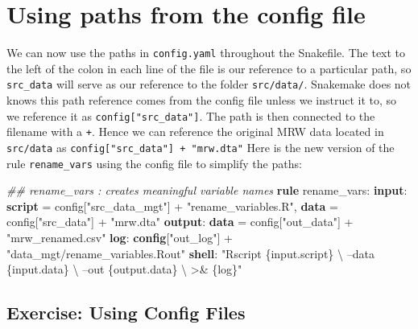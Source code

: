 \documentclass[]{book}
\newenvironment{Shaded}{\begin{snugshade}}{\end{snugshade}}
\newcommand{\KeywordTok}[1]{\textcolor[rgb]{0.13,0.29,0.53}{\textbf{{#1}}}}
\newcommand{\StringTok}[1]{\textcolor[rgb]{0.31,0.60,0.02}{{#1}}}
\newcommand{\CommentTok}[1]{\textcolor[rgb]{0.56,0.35,0.01}{\textit{{#1}}}}
\newcommand{\NormalTok}[1]{{#1}}
\theoremstyle{definition}
\theoremstyle{definition}
\theoremstyle{definition}
\theoremstyle{remark}
\begin{document}
\section{Using paths from the config
file}\label{using-paths-from-the-config-file}

We can now use the paths in \texttt{config.yaml} throughout the
Snakefile. The text to the left of the colon in each line of the file is
our reference to a particular path, so \texttt{src\_data} will serve as
our reference to the folder \texttt{src/data/}. Snakemake does not knows
this path reference comes from the config file unless we instruct it to,
so we reference it as \texttt{config{[}"src\_data"{]}}. The path is then
connected to the filename with a \texttt{+}. Hence we can reference the
original MRW data located in \texttt{src/data} as
\texttt{config{[}"src\_data"{]}\ +\ "mrw.dta"} Here is the new version
of the rule \texttt{rename\_vars} using the config file to simplify the
paths:

\begin{Shaded}
\begin{Highlighting}[]
\CommentTok{## rename_vars        : creates meaningful variable names}
\KeywordTok{rule} \NormalTok{rename_vars:}
    \KeywordTok{input}\NormalTok{:}
        \KeywordTok{script} \NormalTok{= config[}\StringTok{"src_data_mgt"}\NormalTok{] + }\StringTok{"rename_variables.R"}\NormalTok{,}
        \KeywordTok{data}   \NormalTok{= config[}\StringTok{"src_data"}\NormalTok{] + }\StringTok{"mrw.dta"}
    \KeywordTok{output}\NormalTok{:}
        \KeywordTok{data} \NormalTok{= config[}\StringTok{"out_data"}\NormalTok{] + }\StringTok{"mrw_renamed.csv"}
    \KeywordTok{log}\NormalTok{:}
        \KeywordTok{config}\NormalTok{[}\StringTok{"out_log"}\NormalTok{] + }\StringTok{"data_mgt/rename_variables.Rout"}
    \KeywordTok{shell}\NormalTok{:}
        \StringTok{"Rscript \{input.script\} \textbackslash{}}
\StringTok{            --data \{input.data\} \textbackslash{}}
\StringTok{            --out \{output.data\} \textbackslash{}}
\StringTok{            >& \{log\}"}
\end{Highlighting}
\end{Shaded}

\subsection*{Exercise: Using Config
Files}\label{exercise-using-config-files}
\end{document}
